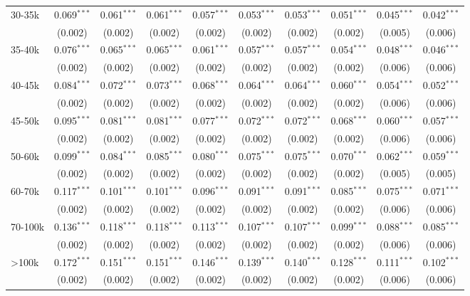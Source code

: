 \begin{table}[!htbp]
\begin{tabular}{@{\extracolsep{5pt}}lccccccccc}
  30-35k & 0.069$^{***}$ & 0.061$^{***}$ & 0.061$^{***}$ & 0.057$^{***}$ & 0.053$^{***}$ & 0.053$^{***}$ & 0.051$^{***}$ & 0.045$^{***}$ & 0.042$^{***}$ \\ 
  & (0.002) & (0.002) & (0.002) & (0.002) & (0.002) & (0.002) & (0.002) & (0.005) & (0.006) \\ 
  35-40k & 0.076$^{***}$ & 0.065$^{***}$ & 0.065$^{***}$ & 0.061$^{***}$ & 0.057$^{***}$ & 0.057$^{***}$ & 0.054$^{***}$ & 0.048$^{***}$ & 0.046$^{***}$ \\ 
  & (0.002) & (0.002) & (0.002) & (0.002) & (0.002) & (0.002) & (0.002) & (0.006) & (0.006) \\ 
  40-45k & 0.084$^{***}$ & 0.072$^{***}$ & 0.073$^{***}$ & 0.068$^{***}$ & 0.064$^{***}$ & 0.064$^{***}$ & 0.060$^{***}$ & 0.054$^{***}$ & 0.052$^{***}$ \\ 
  & (0.002) & (0.002) & (0.002) & (0.002) & (0.002) & (0.002) & (0.002) & (0.006) & (0.006) \\ 
  45-50k & 0.095$^{***}$ & 0.081$^{***}$ & 0.081$^{***}$ & 0.077$^{***}$ & 0.072$^{***}$ & 0.072$^{***}$ & 0.068$^{***}$ & 0.060$^{***}$ & 0.057$^{***}$ \\ 
  & (0.002) & (0.002) & (0.002) & (0.002) & (0.002) & (0.002) & (0.002) & (0.006) & (0.006) \\ 
  50-60k & 0.099$^{***}$ & 0.084$^{***}$ & 0.085$^{***}$ & 0.080$^{***}$ & 0.075$^{***}$ & 0.075$^{***}$ & 0.070$^{***}$ & 0.062$^{***}$ & 0.059$^{***}$ \\ 
  & (0.002) & (0.002) & (0.002) & (0.002) & (0.002) & (0.002) & (0.002) & (0.005) & (0.005) \\ 
  60-70k & 0.117$^{***}$ & 0.101$^{***}$ & 0.101$^{***}$ & 0.096$^{***}$ & 0.091$^{***}$ & 0.091$^{***}$ & 0.085$^{***}$ & 0.075$^{***}$ & 0.071$^{***}$ \\ 
  & (0.002) & (0.002) & (0.002) & (0.002) & (0.002) & (0.002) & (0.002) & (0.006) & (0.006) \\ 
  70-100k & 0.136$^{***}$ & 0.118$^{***}$ & 0.118$^{***}$ & 0.113$^{***}$ & 0.107$^{***}$ & 0.107$^{***}$ & 0.099$^{***}$ & 0.088$^{***}$ & 0.085$^{***}$ \\ 
  & (0.002) & (0.002) & (0.002) & (0.002) & (0.002) & (0.002) & (0.002) & (0.006) & (0.006) \\ 
  >100k & 0.172$^{***}$ & 0.151$^{***}$ & 0.151$^{***}$ & 0.146$^{***}$ & 0.139$^{***}$ & 0.140$^{***}$ & 0.128$^{***}$ & 0.111$^{***}$ & 0.102$^{***}$ \\ 
  & (0.002) & (0.002) & (0.002) & (0.002) & (0.002) & (0.002) & (0.002) & (0.006) & (0.006) \\ 

\end{tabular}
\end{table}
